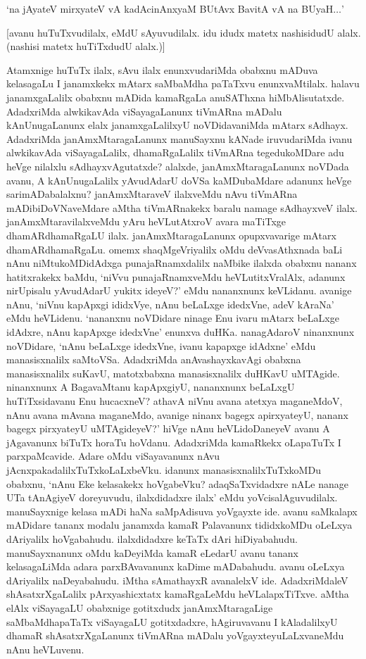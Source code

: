 \begin{shloka}
`na jAyateV mirxyateV vA kadAcinAnx\s yaM BUtAvx BavitA vA na BUyaH$\ldots$' 
\end{shloka}

[avanu huTuTxvudilalx, eMdU sAyuvudilalx. idu idudx matetx nashisidudU alalx. (nashisi matetx huTiTxdudU alalx.)]

Atamxnige huTuTx ilalx, sAvu ilalx enunxvudariMda obabxnu mADuva kelasagaLu I janamxkekx mAtarx saMbaMdha paTaTxvu enunxvaMtilalx. halavu janamxgaLalilx obabxnu mADida kamaRgaLa anuSAThxna hiMbAlisutatxde. AdadxriMda alwkikavAda viSayagaLanunx tiVmARna mADalu kAnUnugaLanunx elalx janamxgaLalilxyU noVDidavaniMda mAtarx sAdhayx. AdadxriMda janAmxMtaragaLanunx manuSayxnu kANade iruvudariMda ivanu alwkikavAda viSayagaLalilx, dhamaRgaLalilx tiVmARna tegedukoMDare adu heVge nilalxlu sAdhayxvAgutatxde? alalxde, janAmxMtaragaLanunx noVDada avanu, A kAnUnugaLalilx yAvudAdarU doVSa kaMDubaMdare adanunx heVge sarimADabalalxnu? janAmxMtaraveV ilalxveMdu nAvu tiVmARna mADibiDoVNaveMdare aMtha tiVmARnakekx baralu namage sAdhayxveV ilalx. janAmxMtaravilalxveMdu yAru heVLutAtxroV avara maTiTxge dhamARdhamaRgaLU ilalx. janAmxMtaragaLanunx opupxvavarige mAtarx dhamARdhamaRgaLu. omemx shaqMgeVriyalilx oMdu deVvasAthxnada baLi nAnu niMtukoMDidAdxga punajaRnamxdalilx naMbike ilalxda obabxnu nananx hatitxrakekx baMdu, `niVvu punajaRnamxveMdu heVLutitxVralAlx, adanunx nirUpisalu yAvudAdarU yukitx ideyeV?' eMdu nananxnunx keVLidanu. avanige nAnu, `niVnu kapApxgi ididxVye, nAnu beLaLxge idedxVne, adeV kAraNa' eMdu heVLidenu. `nananxnu noVDidare ninage Enu ivaru mAtarx beLaLxge idAdxre, nAnu kapApxge idedxVne' enunxva duHKa. nanagAdaroV ninanxnunx noVDidare, `nAnu beLaLxge idedxVne, ivanu kapapxge idAdxne' eMdu manasisxnalilx saMtoVSa. AdadxriMda anAvashayxkavAgi obabxna manasisxnalilx suKavU, matotxbabxna manasisxnalilx duHKavU uMTAgide. ninanxnunx A BagavaMtanu kapApxgiyU, nananxnunx beLaLxgU huTiTxsidavanu Enu hucacxneV? athavA niVnu avana atetxya maganeMdoV, nAnu avana mAvana maganeMdo, avanige ninanx bagegx apirxyateyU, nananx bagegx pirxyateyU uMTAgideyeV?' hiVge nAnu heVLidoDaneyeV avanu A jAgavanunx biTuTx horaTu hoVdanu. AdadxriMda kamaRkekx oLapaTuTx I parxpaMcavide. Adare oMdu viSayavanunx nAvu jAcnxpakadalilxTuTxkoLaLxbeVku. idanunx manasisxnalilxTuTxkoMDu obabxnu, `nAnu Eke kelasakekx hoVgabeVku? adaqSaTxvidadxre nALe nanage UTa tAnAgiyeV doreyuvudu, ilalxdidadxre ilalx' eMdu yoVcisalAguvudilalx. manuSayxnige kelasa mADi haNa saMpAdisuva yoVgayxte ide. avanu saMkalapx mADidare tananx modalu janamxda kamaR Palavanunx tididxkoMDu oLeLxya dAriyalilx hoVgabahudu. ilalxdidadxre keTaTx dAri hiDiyabahudu. manuSayxnanunx oMdu kaDeyiMda kamaR eLedarU avanu tananx kelasagaLiMda adara parxBAvavanunx kaDime mADabahudu. avanu oLeLxya dAriyalilx naDeyabahudu. iMtha sAmathayxR avanalelxV ide. AdadxriMdaleV shAsatxrXgaLalilx pArxyashicxtatx kamaRgaLeMdu heVLalapxTiTxve. aMtha elAlx viSayagaLU obabxnige gotitxdudx janAmxMtaragaLige saMbaMdhapaTaTx viSayagaLU gotitxdadxre, hAgiruvavanu I kAladalilxyU dhamaR shAsatxrXgaLanunx tiVmARna mADalu yoVgayxteyuLaLxvaneMdu nAnu heVLuvenu.

